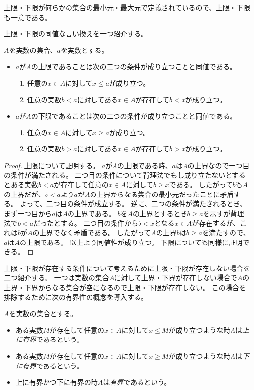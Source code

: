 上限・下限が何らかの集合の最小元・最大元で定義されているので、上限・下限も一意である。

上限・下限の同値な言い換えを一つ紹介する。

\begin{proposition}
$A$を実数の集合、$a$を実数とする。
\begin{itemize}
\item
$a$が$A$の上限であることは次の二つの条件が成り立つことと同値である。
\begin{enumerate}
\item
任意の$x \in A$に対して$x \le a$が成り立つ。
\item
任意の実数$b < a$に対してある$x \in A$が存在して$b < x$が成り立つ。
\end{enumerate}
\item
$a$が$A$の下限であることは次の二つの条件が成り立つことと同値である。
\begin{enumerate}
\item
任意の$x \in A$に対して$x \ge a$が成り立つ。
\item
任意の実数$b > a$に対してある$x \in A$が存在して$b > x$が成り立つ。
\end{enumerate}
\end{itemize}
\end{proposition}

\begin{proof}
上限について証明する。
$a$が$A$の上限である時、$a$は$A$の上界なので一つ目の条件が満たされる。
二つ目の条件について背理法でもし成り立たないとするとある実数$b < a$が存在して任意の$x \in A$に対して$b \ge x$である。
したがって$b$も$A$の上界だが、$b < a$より$a$が$A$の上界からなる集合の最小元だったことに矛盾する。
よって、二つ目の条件が成立する。
逆に、二つの条件が満たされるとき、まず一つ目から$a$は$A$の上界である。
$b$を$A$の上界とするとき$b \ge a$を示すが背理法で$b < a$だったとする。
二つ目の条件から$b < x$となる$x \in A$が存在するが、これは$b$が$A$の上界でなく矛盾である。
したがって$A$の上界$b$は$b \ge a$を満たすので、$a$は$A$の上限である。
以上より同値性が成り立つ。
下限についても同様に証明できる。
\end{proof}

上限・下限が存在する条件について考えるために上限・下限が存在しない場合を二つ紹介する。
一つは実数の集合$A$に対して上界・下界が存在しない場合で$A$の上界・下界からなる集合が空になるので上限・下限が存在しない。
この場合を排除するために次の有界性の概念を導入する。

\begin{definition}[集合の有界性]
\label{d_bdd}
$A$を実数の集合とする。
\begin{itemize}
\item
ある実数$M$が存在して任意の$x \in A$に対して$x \le M$が成り立つような時$A$は\emph{上に有界}であるという。
\item
ある実数$M$が存在して任意の$x \in A$に対して$x \ge M$が成り立つような時$A$は\emph{下に有界}であるという。
\item
上に有界かつ下に有界の時$A$は\emph{有界}であるという。
\end{itemize}
\end{definition}

